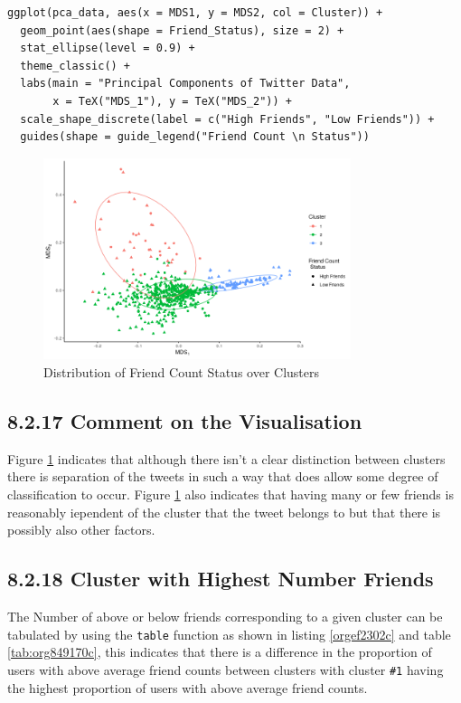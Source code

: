 \documentclass[11pt]{article}
\begin{document}
\begin{listing}[htbp]
\begin{verbatim}
ggplot(pca_data, aes(x = MDS1, y = MDS2, col = Cluster)) +
  geom_point(aes(shape = Friend_Status), size = 2) +
  stat_ellipse(level = 0.9) +
  theme_classic() +
  labs(main = "Principal Components of Twitter Data",
       x = TeX("MDS_1"), y = TeX("MDS_2")) +
  scale_shape_discrete(label = c("High Friends", "Low Friends")) +
  guides(shape = guide_legend("Friend Count \n Status"))
\end{verbatim}
\caption{\label{orgcd362d2}Create a plot of the distribution of Friends Count Status as shown in figure \ref{fig:org4e02c78}}
\end{listing}

\begin{figure}[htbp]
\centering
\includegraphics[width=9cm]{./Figures/betclustplot8216.png}
\caption{\label{fig:org4e02c78}Distribution of Friend Count Status over Clusters}
\end{figure}

\subsection{8.2.17 Comment on the Visualisation}
\label{sec:orgd9705a9}
Figure \ref{fig:org4e02c78} indicates that although there isn't a clear distinction between
clusters there is separation of the tweets in such a way that does allow some
degree of classification to occur. Figure \ref{fig:org4e02c78}  also indicates that having
many or few friends is reasonably iependent of the cluster that the tweet
belongs to but that there is possibly also other factors.
\subsection{8.2.18 Cluster with Highest Number Friends}
\label{sec:org49e9bcb}
The Number of above or below friends corresponding to a given cluster can be tabulated by using the \texttt{table} function as shown in listing \ref{orgef2302c} and table \ref{tab:org849170c}, this indicates that there is a difference in the proportion of users with above average friend counts between clusters with cluster \texttt{\#1} having the highest proportion of users with above average friend counts.
\end{document}
